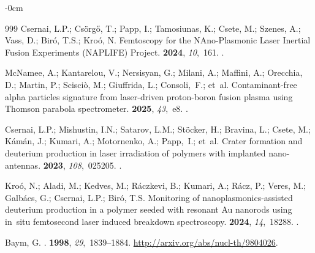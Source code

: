 \documentclass[particles,article,accept,pdftex,moreauthors]{Definitions/mdpi}
\begin{document}
\begin{adjustwidth}{-\extralength}{0cm}
\begin{thebibliography}{999}
Csernai, L.P.; Csörgő, T.; Papp, I.; Tamosiunas, K.; Csete, M.; Szenes, A.; Vass, D.; Biró, T.S.; Kroó, N.
\newblock Femtoscopy for the {NAno-Plasmonic Laser Inertial Fusion Experiments
  (NAPLIFE)} Project.
 {\bf 2024}, {\em 10},~161.
.

McNamee, A.; Kantarelou, V.;  Nersisyan, G.; Milani, A.; Maffini, A.; Orecchia, D.; Martin, P.; Scisciò, M.; Giuffrida, L.; Consoli,~F.; et~al.
\newblock Contaminant-free alpha particles signature from laser-driven
  proton-boron fusion plasma using Thomson parabola spectrometer.
 {\bf 2025}, {\em 43},~e8.
.

Csernai, L.P.; Mishustin, I.N.; Satarov, L.M.; Stöcker, H.; Bravina, L.; Csete, M.; Kámán, J.; Kumari, A.; Motornenko, A.; Papp,~I.; et~al.
\newblock Crater formation and deuterium production in laser irradiation of
  polymers with implanted nano-antennas.
 {\bf 2023}, {\em 108},~025205.
.

Kro{\'o}, N.; Aladi, M.; Kedves, M.; Ráczkevi, B.; Kumari, A.; Rácz, P.; Veres, M.; Galbács, G.; Csernai, L.P.; Biró, T.S.
\newblock Monitoring of nanoplasmonics-assisted deuterium production in a
  polymer seeded with resonant {Au} nanorods using in~situ femtosecond laser
  induced breakdown spectroscopy.
 {\bf 2024}, {\em 14},~18288.
.

Baym, G.
.
 {\bf 1998}, {\em 29},~1839--1884.
  \url{http://arxiv.org/abs/nucl-th/9804026}.


\end{thebibliography}
\end{adjustwidth}
\end{document}
